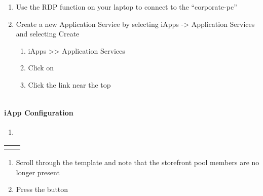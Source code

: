 \documentclass[letterpaper,10pt,english]{sphinxmanual}
\begin{document}
\begin{enumerate}
\item {} 
Use the RDP function on your laptop to connect to the “corporate-pc”

\item {} 
Create a new Application Service by selecting iApps -\textgreater{} Application
Services and selecting Create
\begin{enumerate}
\item {} 
iApps \textgreater{}\textgreater{} Application Services

\item {} 
Click on 

\item {} 
Click the  link near the top

\end{enumerate}

\end{enumerate}


\begin{savenotes}\sphinxattablestart
\centering
\begin{tabulary}{\linewidth}[t]{|T|}
\hline
\\
\hline
\end{tabulary}
\par
\sphinxattableend\end{savenotes}


\paragraph{iApp Configuration}
\label{\detokenize{class2/module2/lab1:id5}}\begin{enumerate}
\item {} 

\end{enumerate}


\begin{savenotes}\sphinxattablestart
\centering
\begin{tabulary}{\linewidth}[t]{|T|T|}
\hline
{}\relax &\relax \\
\hline&\\
\hline
\end{tabulary}
\par
\sphinxattableend\end{savenotes}
\begin{enumerate}
\item {} 
Scroll through the template and note that the storefront pool members
are no longer present

\item {} 
Press the  button

\end{enumerate}
\end{document}
